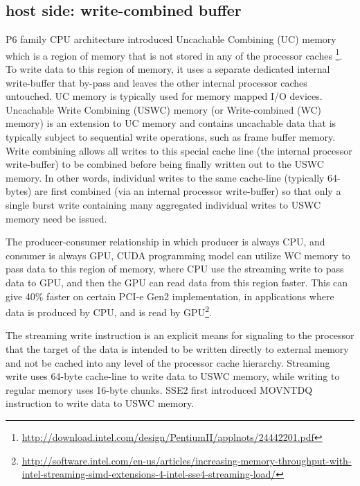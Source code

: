 \subsection{host side: write-combined buffer}
\label{sec:cudac_writecombined}


P6 family CPU architecture introduced Uncachable Combining (UC) memory which is
a region of memory that is not stored in any of the processor caches
\footnote{\url{http://download.intel.com/design/PentiumII/applnots/24442201.pdf}}.
To write data to this region of memory, it uses a separate dedicated internal
write-buffer that by-pass and leaves the other internal processor caches untouched.
UC memory is typically used for memory mapped I/O devices. Uncachable Write
Combining (USWC) memory (or Write-combined (WC) memory) is an extension to UC
memory and contains uncachable data that is typically subject to sequential
write operations, such as frame buffer memory.
Write combining allows all writes to this special cache line (the internal
processor write-buffer) to be combined before being finally written out to
the USWC memory. In other words, individual writes to the same cache-line
(typically 64-bytes) are first combined (via an internal processor write-buffer) so that
only a single burst write containing many aggregated individual writes to USWC
memory need be issued.

The producer-consumer relationship in which producer is always CPU,
and consumer is always GPU, CUDA programming model can utilize WC memory to pass
data to this region of memory, where CPU use the streaming write to pass data
to GPU, and then the GPU can read data from this region faster.
This can give 40\% faster on certain PCI-e Gen2 implementation, in applications where
data is produced by CPU, and is read by
GPU\footnote{\url{http://software.intel.com/en-us/articles/increasing-memory-throughput-with-intel-streaming-simd-extensions-4-intel-sse4-streaming-load/}}.

\begin{framed}
The streaming write instruction is an explicit means for signaling to the
processor that the target of the data is intended to be written directly to
external memory and not  be cached into any level of the processor cache
hierarchy. Streaming write uses 64-byte cache-line to write data to USWC memory,
while writing to regular memory uses 16-byte chunks. SSE2 first introduced
MOVNTDQ instruction to write data to USWC memory.
\end{framed}

